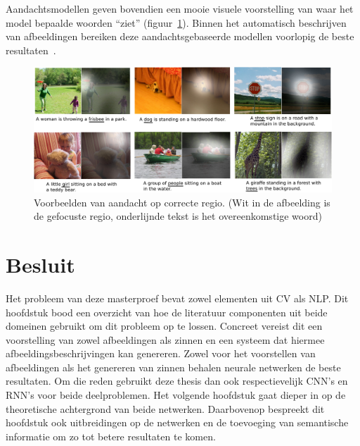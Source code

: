 Aandachtsmodellen geven bovendien een mooie visuele voorstelling van waar het model bepaalde woorden ``ziet'' (figuur~\ref{fig:attention-example}). Binnen het automatisch beschrijven van afbeeldingen bereiken deze aandachtsgebaseerde modellen voorlopig de beste resultaten~\cite{Jin2015,Xu2015}.

\begin{figure}[tb]
	\centering
	\includegraphics[width=\linewidth]{Images/good_Xu.pdf}
	\caption[Voorbeelden van aandacht op correcte regio.]{Voorbeelden van aandacht op correcte regio. (Wit in de afbeelding is de gefocuste regio, onderlijnde tekst is het overeenkomstige woord)~\cite{Xu2015}}
	\label{fig:attention-example}
\end{figure}


\section{Besluit}
Het probleem van deze masterproef bevat zowel elementen uit CV als NLP. Dit hoofdstuk bood een overzicht van hoe de literatuur componenten uit beide domeinen gebruikt om dit probleem op te lossen. Concreet vereist dit een voorstelling van zowel afbeeldingen als zinnen en een systeem dat hiermee afbeeldingsbeschrijvingen kan genereren. Zowel voor het voorstellen van afbeeldingen als het genereren van zinnen behalen neurale netwerken de beste resultaten. Om die reden gebruikt deze thesis dan ook respectievelijk CNN's en RNN's voor beide deelproblemen. Het volgende hoofdstuk gaat dieper in op de theoretische achtergrond van beide netwerken. Daarbovenop bespreekt dit hoofdstuk ook uitbreidingen op de netwerken en de toevoeging van semantische informatie om zo tot betere resultaten te komen.


